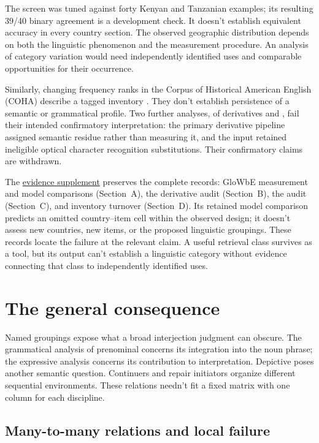 \documentclass[12pt]{article}
\begin{document}
The screen was tuned against forty Kenyan and Tanzanian examples;
its resulting 39/40 binary agreement is a development check. It doesn't
establish equivalent accuracy in every country section. The observed
geographic distribution depends on both the linguistic
phenomenon and the measurement procedure. An analysis of category
variation would need independently identified uses and comparable
opportunities for their occurrence.

Similarly, changing frequency ranks in the Corpus of Historical American
English (COHA) describe a tagged inventory \citep{davies2010}.
They don't establish persistence of a semantic or grammatical profile.
Two further analyses, of derivatives and , fail their
intended confirmatory interpretation: the primary derivative pipeline
assigned semantic residue rather than measuring it, and the 
input retained ineligible optical character recognition substitutions.
Their confirmatory claims are withdrawn.

The \href{inquiry-relative-evidence-supplement.pdf}{evidence supplement}
preserves the complete records: GloWbE measurement and model comparisons
(Section~A), the derivative audit (Section~B), the  audit
(Section~C), and inventory turnover (Section~D). Its retained model
comparison predicts an omitted country--item cell within the observed
design; it doesn't assess new countries, new items, or the proposed
linguistic groupings. These records locate
the failure at the relevant claim. A useful retrieval class survives
as a tool, but its output can't establish a linguistic category
without evidence connecting that class to independently identified uses.

\section{The general consequence}\label{sec:discussion}

Named groupings expose what a broad interjection judgment can obscure.
The grammatical analysis of prenominal  concerns its
integration into the noun phrase; the expressive analysis concerns
its contribution to interpretation. Depictive  poses
another semantic question. Continuers and repair initiators organize
different sequential environments. These relations needn't fit a
fixed matrix with one column for each discipline.

\subsection{Many-to-many relations and local failure}
\end{document}
